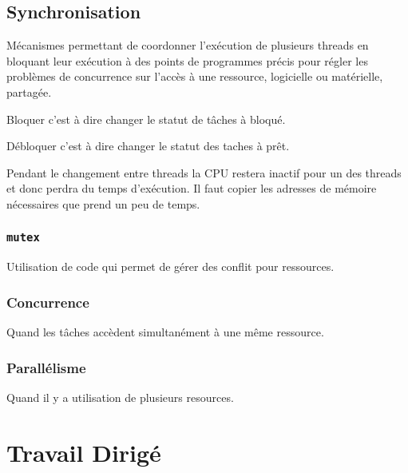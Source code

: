 \documentclass{article}
\begin{document}
\subsection{Synchronisation}
\begin{definition}\label{def:synchronisation}
    Mécanismes permettant de coordonner l'exécution de plusieurs threads en bloquant leur exécution à des points de programmes précis pour régler les problèmes de concurrence sur l'accès à une ressource, logicielle ou matérielle, partagée.

    \begin{remark}
        Bloquer c'est à dire changer le statut de tâches à bloqué.
    \end{remark}
    \begin{remark}
        Débloquer c'est à dire changer le statut des taches à prêt.
    \end{remark}

    Pendant le changement entre threads la CPU restera inactif pour un des threads et donc perdra du temps d'exécution. Il faut copier les adresses de mémoire nécessaires que prend un peu de temps.
\end{definition}

\subsubsection{\texttt{mutex}}
\begin{definition}\label{def:mutex}
    Utilisation de code qui permet de gérer des conflit pour ressources. 
\end{definition}

\subsubsection{Concurrence}
\begin{definition}\label{def:concurrence}
    Quand les tâches accèdent simultanément à une même ressource.
\end{definition}

\subsubsection{Parallélisme}
\begin{definition}\label{def:parallelisme}
    Quand il y a utilisation de plusieurs resources.
\end{definition}


\section{Travail Dirigé}
\end{document}
